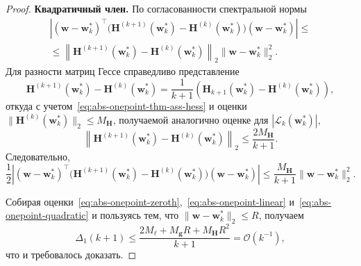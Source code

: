 \begin{proof}
    \textbf{Квадратичный член.} По согласованности спектральной нормы
    \begin{multline}
        \left|
            (\mathbf w-\mathbf w_k^*)^\top
            \Big(
                \mathbf H^{(k+1)}(\mathbf w_k^*)
                -
                \mathbf H^{(k)}(\mathbf w_k^*)
            \Big)
            (\mathbf w-\mathbf w_k^*)
        \right|
        \leqslant
        \\
        \leqslant
        \left\|
            \mathbf H^{(k+1)}(\mathbf w_k^*)
            -
            \mathbf H^{(k)}(\mathbf w_k^*)
        \right\|_2
        \|\mathbf w-\mathbf w_k^*\|_2^2.
    \end{multline}
    Для разности матриц Гессе справедливо представление
    \begin{equation}
        \mathbf H^{(k+1)}(\mathbf w_k^*)
        -
        \mathbf H^{(k)}(\mathbf w_k^*)
        =
        \frac{1}{k+1}
        \left(
            \mathbf H_{k+1}(\mathbf w_k^*)
            -
            \mathbf H^{(k)}(\mathbf w_k^*)
        \right),
    \end{equation}
    откуда с учетом~\eqref{eq:abs-onepoint-thm-ass-hess} и оценки $\|\mathbf H^{(k)}(\mathbf w_k^*)\|_2 \leqslant M_{\mathbf H}$, получаемой аналогично оценке для $|\mathcal L_k(\mathbf w_k^*)|$,
    \begin{equation}
        \left\|
            \mathbf H^{(k+1)}(\mathbf w_k^*)
            -
            \mathbf H^{(k)}(\mathbf w_k^*)
        \right\|_2
        \leqslant
        \frac{2M_{\mathbf H}}{k+1}.
    \end{equation}
    Следовательно,
    \begin{equation}
        \label{eq:abs-onepoint-quadratic}
        \frac12
        \left|
            (\mathbf w-\mathbf w_k^*)^\top
            \Big(
                \mathbf H^{(k+1)}(\mathbf w_k^*)
                -
                \mathbf H^{(k)}(\mathbf w_k^*)
            \Big)
            (\mathbf w-\mathbf w_k^*)
        \right|
        \leqslant
        \frac{M_{\mathbf H}}{k+1}
        \|\mathbf w-\mathbf w_k^*\|_2^2.
    \end{equation}

    Собирая оценки~\eqref{eq:abs-onepoint-zeroth},~\eqref{eq:abs-onepoint-linear} и~\eqref{eq:abs-onepoint-quadratic} и пользуясь тем, что $\|\mathbf w-\mathbf w_k^*\|_2 \leqslant R$, получаем
    \begin{equation}
        \Delta_1(k+1)
        \leqslant
        \frac{2M_\ell + M_{\mathbf g}R + M_{\mathbf H}R^2}{k+1}
        = \mathcal{O}(k^{-1}),
    \end{equation}
    что и требовалось доказать.
\end{proof}

